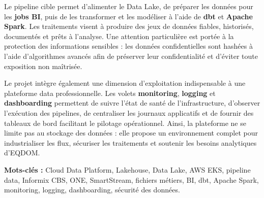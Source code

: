 Le pipeline cible permet d'alimenter le Data Lake, de préparer les données pour les \textbf{jobs BI}, puis de les transformer et les modéliser à l'aide de \textbf{dbt} et \textbf{Apache Spark}. Les traitements visent à produire des jeux de données fiables, historisés, documentés et prêts à l'analyse. Une attention particulière est portée à la protection des informations sensibles : les données confidentielles sont hashées à l'aide d'algorithmes avancés afin de préserver leur confidentialité et d'éviter toute exposition non maîtrisée.

Le projet intègre également une dimension d'exploitation indispensable à une plateforme data professionnelle. Les volets \textbf{monitoring}, \textbf{logging} et \textbf{dashboarding} permettent de suivre l'état de santé de l'infrastructure, d'observer l'exécution des pipelines, de centraliser les journaux applicatifs et de fournir des tableaux de bord facilitant le pilotage opérationnel. Ainsi, la plateforme ne se limite pas au stockage des données : elle propose un environnement complet pour industrialiser les flux, sécuriser les traitements et soutenir les besoins analytiques d'EQDOM.

\vspace{0.12cm}
\noindent\colorbox{lightpanel}{%
  \parbox{\dimexpr\linewidth-2\fboxsep\relax}{%
    \textbf{Mots-clés :} Cloud Data Platform, Lakehouse, Data Lake, AWS EKS, pipeline data, Informix CBS, ONE, SmartStream, fichiers métiers, BI, dbt, Apache Spark, monitoring, logging, dashboarding, sécurité des données.
  }%
}
\endgroup

\clearpage

